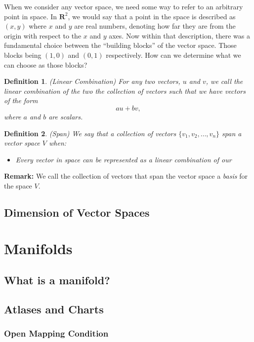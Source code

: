 \documentclass{article}
\newtheorem{definition}{Definition}
\begin{document}
When we consider any vector space, we need some way to refer to an arbitrary point in space. In $\mathbf{R}^2$, we would say that a point in the space is described as $(x,y)$ where $x$ and $y$ are real numbers, denoting how far they are from the origin with respect to the $x$ and $y$ axes. Now within that description, there was a fundamental choice between the ``building blocks'' of the vector space. Those blocks being $(1,0)$ and $(0,1)$ respectively. How can we determine what we can choose as those blocks? 
\begin{definition}
		(Linear Combination) For any two vectors, $u$ and $v$, we call the linear combination of the two the collection of vectors such that we have vectors of the form \[au+bv,\] where $a$ and $b$ are scalars.
\end{definition}	
\begin{definition}
		(Span) We say that a collection of vectors $\{v_1,v_2,\dots,v_n\}$ span a vector space $V$ when:
		\begin{itemize}
				\item Every vector in space can be represented as a linear combination of our 
		\end{itemize}	
\end{definition}	
\textbf{Remark:} We call the collection of vectors that span the vector space a \emph{basis} for the space $V$. 
\subsection{Dimension of Vector Spaces}

\section{Manifolds}
\subsection{What is a manifold?}

\subsection{Atlases and Charts}
\subsubsection{Open Mapping Condition}
\subsection{}
\newpage
\end{document}
